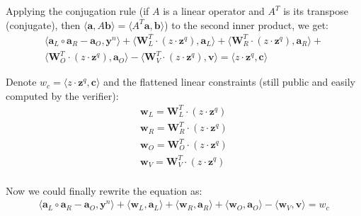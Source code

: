 \documentclass[../lecture-notes-148x210.tex]{subfiles}
\begin{document}
Applying the conjugation rule (if $A$ is a linear operator and $A^T$ is its transpose (conjugate), then $\langle \mathbf{a}, A \mathbf{b} \rangle = \langle A^T \mathbf{a}, \mathbf{b} \rangle$) to the second inner product, we get:
\begin{equation*}
    \begin{aligned}
        \langle \mathbf{a}_L \circ \mathbf{a}_R - \mathbf{a}_O, \mathbf{y}^n \rangle + \langle \mathbf{W}_L^T \cdot (z \cdot \mathbf{z}^q), \mathbf{a}_L \rangle + \langle \mathbf{W}_R^T \cdot (z \cdot \mathbf{z}^q), \mathbf{a}_R \rangle + \\
        \langle \mathbf{W}_O^T \cdot (z \cdot \mathbf{z}^q), \mathbf{a}_O \rangle - \langle \mathbf{W}_V^T \cdot (z \cdot \mathbf{z}^q), \mathbf{v} \rangle = \langle z \cdot \mathbf{z}^q, \mathbf{c} \rangle
    \end{aligned}
\end{equation*}

Denote $w_c = \langle z \cdot \mathbf{z}^q, \mathbf{c} \rangle$ and the flattened linear constraints (still public and easily computed by the verifier):
\begin{equation*}
    \begin{aligned}
        \mathbf{w}_L = \mathbf{W}_L^T \cdot (z \cdot \mathbf{z}^q) \\
        \mathbf{w}_R = \mathbf{W}_R^T \cdot (z \cdot \mathbf{z}^q) \\
        \mathbf{w}_O = \mathbf{W}_O^T \cdot (z \cdot \mathbf{z}^q) \\
        \mathbf{w}_V = \mathbf{W}_V^T \cdot (z \cdot \mathbf{z}^q) \\
    \end{aligned}
\end{equation*}

Now we could finally rewrite the equation as:
\begin{equation*}
    \begin{aligned}
        \langle \mathbf{a}_L \circ \mathbf{a}_R - \mathbf{a}_O, \mathbf{y}^n \rangle + \langle \mathbf{w}_L, \mathbf{a}_L \rangle + \langle \mathbf{w}_R, \mathbf{a}_R \rangle + \langle \mathbf{w}_O, \mathbf{a}_O \rangle - \langle \mathbf{w}_V, \mathbf{v} \rangle = w_c
    \end{aligned}
\end{equation*}
\end{document}
